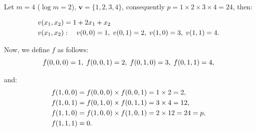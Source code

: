 \documentclass{zkdl-presentation-template}
\begin{document}
    \begin{frame}
        \begin{example}
            Let $m=4$ ($\log m=2$), $\mathbf{v} = \{1, 2, 3, 4\}$, consequently $p = 1\times2\times3\times4=24$, then:
            \vspace{-5px}
            
            \begin{align*}
            v(x_1, x_2)& = 1 + 2x_1 + x_2\\
            v(x_1,x_2)&: \quad v(0,0)=1,\; v(0,1)=2,\; v(1,0)=3,\; v(1,1)=4.
            \vspace{-5px}
            \end{align*}
            
            Now, we define $f$ as follows:
            \vspace{-5px}
            \begin{equation*}
                f(0,0,0)= 1,\; f(0,0,1)=2,\; f(0,1,0)=3,\; f(0,1,1)=4,
                \vspace{-5px}
            \end{equation*}
            
            and:
            \vspace{-10px}
            \begin{align*}
            f(1,0,0)&= f(0,0,0) \times f(0,0,1) = 1 \times 2 = 2,\\ 
            f(1,0,1)&= f(0,1,0) \times f(0,1,1) = 3 \times 4 = 12,\\ 
            f(1,1,0)&= f(1,0,0) \times f(1,0,1) = 2 \times 12 = 24 = p,\\ 
            f(1,1,1)&= 0.
            \vspace{-5px}
            \end{align*}
        \end{example}
    \end{frame}
\end{document}
